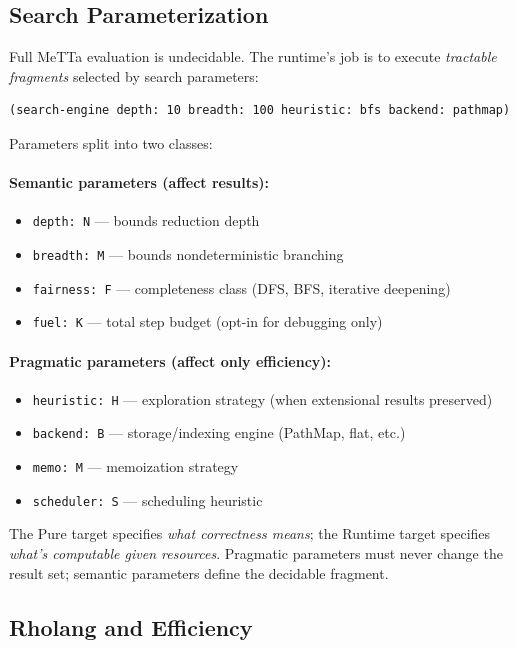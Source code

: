 \documentclass[11pt]{article}
\newcommand{\code}[1]{\texttt{#1}}
\begin{document}
\subsection{Search Parameterization}

Full MeTTa evaluation is undecidable.  The runtime's job is to execute
\emph{tractable fragments} selected by search parameters:

\begin{lstlisting}
(search-engine depth: 10 breadth: 100 heuristic: bfs backend: pathmap)
\end{lstlisting}

Parameters split into two classes:

\paragraph{Semantic parameters (affect results):}
\begin{itemize}
\item \code{depth: N} --- bounds reduction depth
\item \code{breadth: M} --- bounds nondeterministic branching
\item \code{fairness: F} --- completeness class (DFS, BFS, iterative deepening)
\item \code{fuel: K} --- total step budget (opt-in for debugging only)
\end{itemize}

\paragraph{Pragmatic parameters (affect only efficiency):}
\begin{itemize}
\item \code{heuristic: H} --- exploration strategy (when extensional results preserved)
\item \code{backend: B} --- storage/indexing engine (PathMap, flat, etc.)
\item \code{memo: M} --- memoization strategy
\item \code{scheduler: S} --- scheduling heuristic
\end{itemize}

The Pure target specifies \emph{what correctness means}; the Runtime
target specifies \emph{what's computable given resources}.  Pragmatic
parameters must never change the result set; semantic parameters define
the decidable fragment.

\subsection{Rholang and Efficiency}
\end{document}
